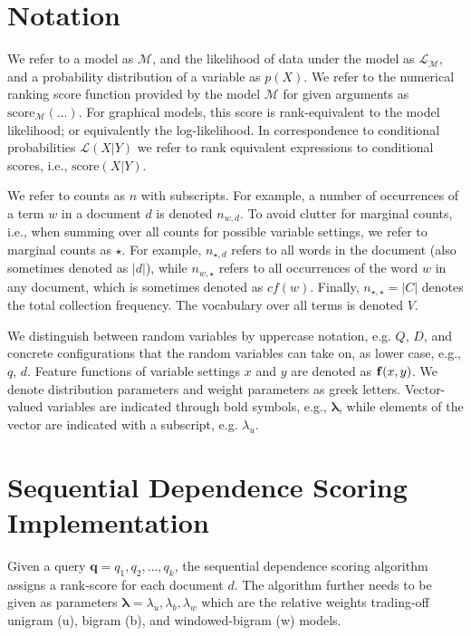\documentclass[]{article}
\begin{document}
\section{Notation}

\label{sec:Notation}We refer to a model as $\mathcal{M}$, and the
likelihood of data under the model as $\mathcal{L}_{\mathcal{M}}$,
and a probability distribution of a variable as $p(X)$. We refer
to the numerical ranking score function provided by the model $\mathcal{M}$ for given arguments
as $\mbox{score}_{\mathcal{M}}(...)$. For graphical models, this
score is rank-equivalent to the model likelihood; or equivalently the log-likelihood.
In correspondence to conditional probabilities $\mathcal{L}(X|Y)$ we
refer to rank equivalent expressions to conditional scores, i.e.,
$\mbox{score}(X|Y)$.

We refer to counts as $n$ with subscripts. For example, a number
of occurrences of a term $w$ in a document $d$ is denoted $n_{w,d}$.
To avoid clutter for marginal counts, i.e., when summing over all counts
for possible variable settings, we refer to marginal counts as $\star$.
For example, $n_{\star,d}$ refers to all words in the document (also
sometimes denoted as $|d|$), while $n_{w,\star}$ refers to all occurrences
of the word $w$ in any document, which is sometimes denoted as $cf(w)$.
Finally, $n_{\star,\star}=|C|$ denotes the total collection frequency.
The vocabulary over all terms is denoted $V$.

We distinguish between random variables by uppercase notation, e.g.
$Q$, $D$, and concrete configurations that the random variables
can take on, as lower case, e.g., $q$, $d$. Feature functions of
variable settings $x$ and $y$ are denoted as $\mbox{\ensuremath{\mathbf{f}}}(x,y)$.
We denote distribution parameters and weight parameters as greek letters.
Vector-valued variables are indicated through bold symbols, e.g., $\boldsymbol{\lambda}$,
while elements of the vector are indicated with a subscript, e.g.
$\lambda_{u}$.

\section{Sequential Dependence Scoring Implementation}

\label{sec:Sequential-Dependence-Algo}Given a query $\mathbf{q}=q_{1},q_{2},\dots,q_{k}$,
the sequential dependence scoring algorithm assigns a rank-score for
each document $d$. The algorithm further needs to be given as parameters
$\boldsymbol{\lambda}=\lambda_{u},\lambda_{b},\lambda_{w}$ which
are the relative weights trading-off unigram (u), bigram (b), and
windowed-bigram (w) models. 
\end{document}
